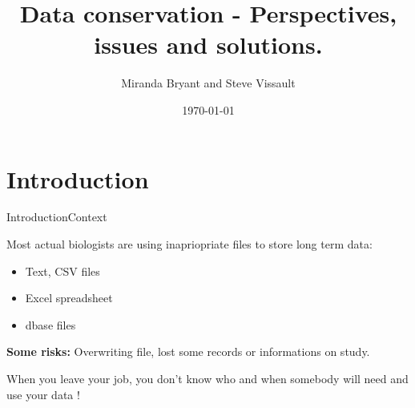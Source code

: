 \documentclass{eecslides}
\title[Data Storage]{Data conservation - Perspectives, issues and solutions.}
\author[M. Bryant and S. Vissault]{\color{white}  Miranda Bryant and Steve Vissault}
\institute[\color{white} UQAR]{\color{white} \textbf{Les midis numériques}}
\date{ \color{white} \today}
\begin{document}
\begin{frame}[plain]
\titlepage
\end{frame}


\section{Introduction}

\begin{frame}{Introduction}{Context}

Most actual biologists are using \alert{inapriopriate files} to store \alert{long term data}:

\begin{itemize}
	\item Text, CSV files
	\item  Excel spreadsheet
	\item  dbase files 
\end{itemize}

\textbf{Some risks:} Overwriting file, lost some records or informations on study.

\pause
\vfill

\alert{When you leave your job, you don't know who and when somebody will need and use your data !} 

\end{frame}






%	
%		
\end{document}
